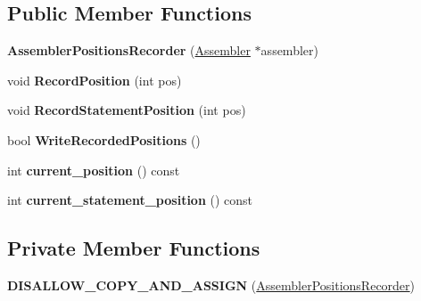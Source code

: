 \subsection*{Public Member Functions}
\begin{DoxyCompactItemize}
\item 
{\bfseries Assembler\+Positions\+Recorder} (\hyperlink{classv8_1_1internal_1_1_assembler}{Assembler} $\ast$assembler)\hypertarget{classv8_1_1internal_1_1_assembler_positions_recorder_a92b3fe2c639a05f3a4b75ad0195a04a5}{}\label{classv8_1_1internal_1_1_assembler_positions_recorder_a92b3fe2c639a05f3a4b75ad0195a04a5}

\item 
void {\bfseries Record\+Position} (int pos)\hypertarget{classv8_1_1internal_1_1_assembler_positions_recorder_af1a00802e63e8b4820e8c76667a90e95}{}\label{classv8_1_1internal_1_1_assembler_positions_recorder_af1a00802e63e8b4820e8c76667a90e95}

\item 
void {\bfseries Record\+Statement\+Position} (int pos)\hypertarget{classv8_1_1internal_1_1_assembler_positions_recorder_a1044767c2b4101d2786c3ee8a6474e44}{}\label{classv8_1_1internal_1_1_assembler_positions_recorder_a1044767c2b4101d2786c3ee8a6474e44}

\item 
bool {\bfseries Write\+Recorded\+Positions} ()\hypertarget{classv8_1_1internal_1_1_assembler_positions_recorder_abe9a3f6119df6db08b3a59701b6b1e5f}{}\label{classv8_1_1internal_1_1_assembler_positions_recorder_abe9a3f6119df6db08b3a59701b6b1e5f}

\item 
int {\bfseries current\+\_\+position} () const \hypertarget{classv8_1_1internal_1_1_assembler_positions_recorder_ad5ad6c72993dffed04c7ebe64323124a}{}\label{classv8_1_1internal_1_1_assembler_positions_recorder_ad5ad6c72993dffed04c7ebe64323124a}

\item 
int {\bfseries current\+\_\+statement\+\_\+position} () const \hypertarget{classv8_1_1internal_1_1_assembler_positions_recorder_afc2b73ba6821be5a75498c1427724bff}{}\label{classv8_1_1internal_1_1_assembler_positions_recorder_afc2b73ba6821be5a75498c1427724bff}

\end{DoxyCompactItemize}
\subsection*{Private Member Functions}
\begin{DoxyCompactItemize}
\item 
{\bfseries D\+I\+S\+A\+L\+L\+O\+W\+\_\+\+C\+O\+P\+Y\+\_\+\+A\+N\+D\+\_\+\+A\+S\+S\+I\+GN} (\hyperlink{classv8_1_1internal_1_1_assembler_positions_recorder}{Assembler\+Positions\+Recorder})\hypertarget{classv8_1_1internal_1_1_assembler_positions_recorder_a9d8d82b5a10c4bd39f27ea673dfbb108}{}\label{classv8_1_1internal_1_1_assembler_positions_recorder_a9d8d82b5a10c4bd39f27ea673dfbb108}

\end{DoxyCompactItemize}
